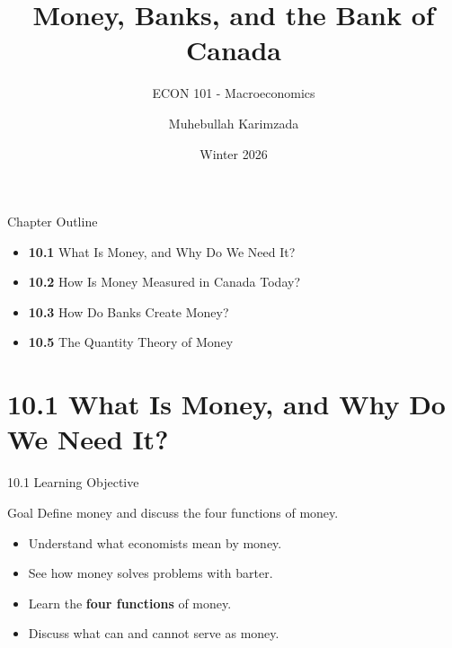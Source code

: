 \documentclass[aspectratio=169]{beamer}
\title{\textbf{Money, Banks, and the Bank of Canada \vspace{.5cm}\\  }}
\subtitle{ {\large ECON 101 - Macroeconomics}}
\author{Muhebullah Karimzada}
\date{Winter 2026}
\begin{document}
\begin{frame}[plain]
  \titlepage
\end{frame}

\begin{frame}{Chapter Outline}
\transfade
\begin{itemize}[<+->]
  \item \textbf{10.1} What Is Money, and Why Do We Need It?
  \item \textbf{10.2} How Is Money Measured in Canada Today?
  \item \textbf{10.3} How Do Banks Create Money?
  \item \textbf{10.5} The Quantity Theory of Money
\end{itemize}
\end{frame}

\section{10.1 What Is Money, and Why Do We Need It?}

\begin{frame}{10.1 Learning Objective}
\transfade
\begin{block}{Goal}
Define money and discuss the four functions of money.
\end{block}
\begin{itemize}[<+->]
  \item Understand what economists mean by \alert{money}.
  \item See how money solves problems with barter.
  \item Learn the \textbf{four functions} of money.
  \item Discuss what can and cannot serve as money.
\end{itemize}
\end{frame}
\end{document}
